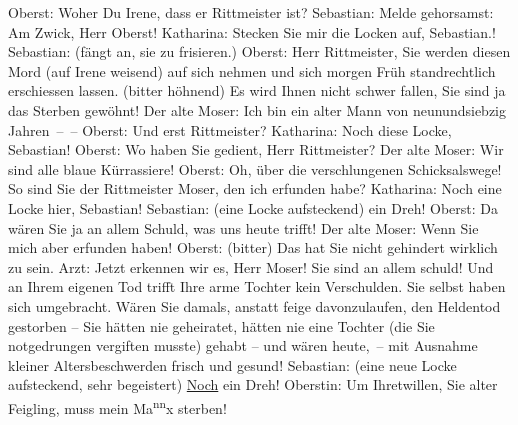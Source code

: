            \pstart
           Oberst: Woher \label{T_L01900_1v}\label{T_L01900_1h} Du Irene, dass er Rittmeister
					ist?\pend
           \pstart
           Sebastian: Melde gehorsamst: Am Zwick, Herr Oberst!\pend
           \pstart
           Katharina: Stecken Sie mir die Locken auf, Sebastian.!\pend
           \pstart
           Sebastian: (fängt an, sie zu frisieren.)\pend
           \pstart
           Oberst: Herr Rittmeister, Sie werden diesen Mord (auf Irene weisend) auf sich
					nehmen und sich morgen Früh standrechtlich erschiessen lassen. (bitter höhnend)
					Es wird Ihnen nicht schwer fallen, Sie sind ja das Sterben gewöhnt!\pend
           \pstart
           Der alte Moser: Ich bin ein alter Mann von neunundsiebzig Jahren – –\pend
           \pstart
           {\pb}Oberst: Und erst
					Rittmeister?\pend
           \pstart
           Katharina: Noch diese Locke, Sebastian!\pend
           \pstart
           Oberst: Wo haben Sie gedient, Herr Rittmeister?\pend
           \pstart
           Der alte Moser: Wir sind alle blaue Kürrassiere!\pend
           \pstart
           Oberst: Oh, über die verschlungenen Schicksalswege! So sind Sie der Rittmeister
					Moser, den ich erfunden habe?\pend
           \pstart
           Katharina: Noch eine Locke hier, Sebastian!\pend
           \pstart
           Sebastian: (eine Locke aufsteckend)  ein Dreh!\pend
           \pstart
           Oberst: Da wären Sie ja an allem Schuld, was uns heute trifft!\pend
           \pstart
           \introOben{}\introOben{}Der alte Moser: Wenn Sie mich aber erfunden haben!\pend
           \pstart
           Oberst: (bitter) Das hat Sie nicht gehindert wirklich zu sein.\pend
           \pstart
           Arzt: Jetzt erkennen wir es, Herr Moser! Sie sind an allem schuld! Und an Ihrem
					eigenen Tod trifft Ihre arme Tochter kein Verschulden. Sie selbst haben sich
					umgebracht. Wären Sie damals, anstatt feige davonzulaufen, den Heldentod
					gestorben – Sie hätten nie geheiratet, hätten nie eine Tochter (die Sie
					notgedrungen vergiften musste) gehabt – und wären heute, – mit Ausnahme kleiner
					Altersbeschwerden frisch und gesund!\pend
           \pstart
           Sebastian: (eine neue Locke aufsteckend, sehr begeistert) \uline{Noch} ein Dreh!\pend
           \pstart
           Oberstin: Um Ihretwillen, Sie alter Feigling, muss mein Ma\substVorne{}\textsuperscript{nn}\substDazwischen{}x\substHinten{} sterben!\pend
